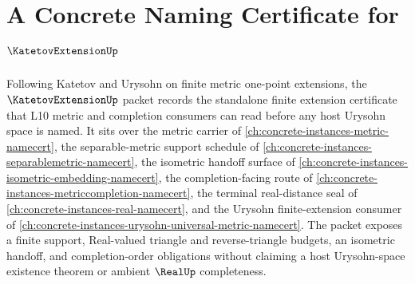 \chapter{A Concrete Naming Certificate for $\KatetovExtensionUp$}
\label{ch:concrete-instances-katetov-extension-namecert}

Following Katetov and Urysohn on finite metric one-point extensions, the $\KatetovExtensionUp$ packet records the standalone finite extension certificate that L10 metric and completion consumers can read before any host Urysohn space is named. It sits over the metric carrier of \autoref{ch:concrete-instances-metric-namecert}, the separable-metric support schedule of \autoref{ch:concrete-instances-separablemetric-namecert}, the isometric handoff surface of \autoref{ch:concrete-instances-isometric-embedding-namecert}, the completion-facing route of \autoref{ch:concrete-instances-metriccompletion-namecert}, the terminal real-distance seal of \autoref{ch:concrete-instances-real-namecert}, and the Urysohn finite-extension consumer of \autoref{ch:concrete-instances-urysohn-universal-metric-namecert}. The packet exposes a finite support, Real-valued triangle and reverse-triangle budgets, an isometric handoff, and completion-order obligations without claiming a host Urysohn-space existence theorem or ambient $\RealUp$ completeness.

